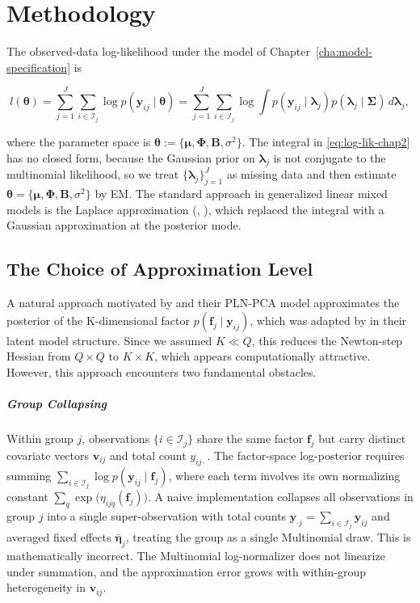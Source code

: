 \chapter{Methodology}
\label{cha:methodology}

The observed-data log-likelihood under the model of Chapter~\ref{cha:model-specification} is

\begin{equation}
    l(\bm{\theta})=\sum_{j=1}^{J}\sum_{i\in \mathcal{I}_{j}}\log p(\bm{y}_{ij}\mid \bm{\theta})=\sum_{j=1}^{J}\sum_{i\in \mathcal{I}_{j}}\log \int p(\bm{y}_{ij}\mid \bm{\lambda}_{j})p(\bm{\lambda}_{j}\mid \bm{\Sigma})\,d\bm{\lambda}_{j},
    \label{eq:log-lik-chap2}
\end{equation}

where the parameter space is $\bm{\theta}:=\{\bm{\mu}, \bm{\Phi}, \mathbf{B},\sigma^{2}\}$. The integral in \eqref{eq:log-lik-chap2} has no closed form, because the Gaussian prior on $\bm{\lambda}_{j}$ is not conjugate to the multinomial likelihood, so we treat $\{\bm{\lambda}_{j}\}_{j=1}^{J}$ as missing data and then estimate $\bm{\theta}=\{\bm{\mu}, \bm{\Phi}, \mathbf{B},\sigma^{2}\}$ by EM. The standard approach in generalized linear mixed models is the Laplace approximation (\citep{Breslow1993}, \citep{Tierney1986}), which replaced the integral with a Gaussian approximation at the posterior mode.

\iffalse
\section{The Choice of Approximation Level}
\label{sec:the-choice-of-approximation-level}

A natural approach motivated by \citet{Chiquet2018} and their PLN-PCA model approximates the posterior of the K-dimensional factor $p(\mathbf{f}_{j}\mid \bm{y}_{ij})$, which was adapted by \citet{mcgillycuddy2024} in their latent model structure. Since we assumed $K\ll Q$, this reduces the Newton-step Hessian from $Q\times Q$ to $K\times K$, which appears computationally attractive. However, this approach encounters two fundamental obstacles. 

\paragraph*{Group Collapsing} Within group $j$, observations $\{i\in \mathcal{I}_{j}\}$ share the same factor $\mathbf{f}_{j}$ but carry distinct covariate vectors $\bm{v}_{ij}$ and total count $y_{ij\cdot}$. The factor-space log-posterior requires summing $\sum_{i\in \mathcal{I}_{j}}\log p(\bm{y}_{ij}\mid \mathbf{f}_{j})$, where each term involves its own normalizing constant $\sum_q \exp\bigl(\eta_{ijq}(\mathbf{f}_j)\bigr)$. A naive implementation collapses all observations in group $j$ into a single super-observation with total counts $\bm{y}_{\cdot j} = \sum_{i\in \mathcal{I}_{j}} \bm{y}_{ij}$ and averaged fixed effects $\bar{\bm{\eta}}_{j}$, treating the group as a single Multinomial draw. This is mathematically incorrect. The Multinomial log-normalizer does not linearize under summation, and the approximation error grows with within-group heterogeneity in $\bm{v}_{ij}$. 

